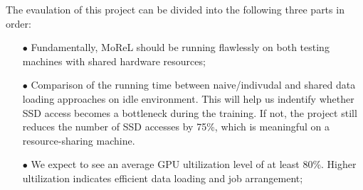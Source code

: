 \documentclass[conference]{IEEEtran}
\begin{document}
The evaulation of this project can be divided into the following three parts in order:
\begin{itemize}
	\item[$\bullet$]  Fundamentally, MoReL should be running flawlessly on both testing machines with shared hardware resources;
	\item[$\bullet$]  Comparison of the running time between naive/indivudal and shared data loading approaches on idle environment. 
		This will help us indentify whether SSD access becomes a bottleneck during the training. 
		If not, the project still reduces the number of SSD accesses by 75\%, which is meaningful on a resource-sharing machine. 
	\item[$\bullet$]  We expect to see an average GPU ultilization level of at least 80\%. 
		Higher ultilization indicates efficient data loading and job arrangement;
\end{itemize}
\end{document}
